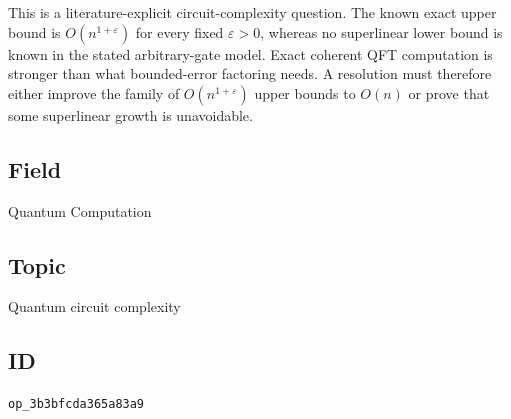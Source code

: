 This is a literature-explicit circuit-complexity question. The known exact upper bound is $O(n^{1+\varepsilon})$ for every fixed $\varepsilon>0$, whereas no superlinear lower bound is known in the stated arbitrary-gate model. Exact coherent QFT computation is stronger than what bounded-error factoring needs. A resolution must therefore either improve the family of $O(n^{1+\varepsilon})$ upper bounds to $O(n)$ or prove that some superlinear growth is unavoidable.

\subsection*{Field}

Quantum Computation

\subsection*{Topic}

Quantum circuit complexity

\subsection*{ID}

\texttt{op\_3b3bfcda365a83a9}
